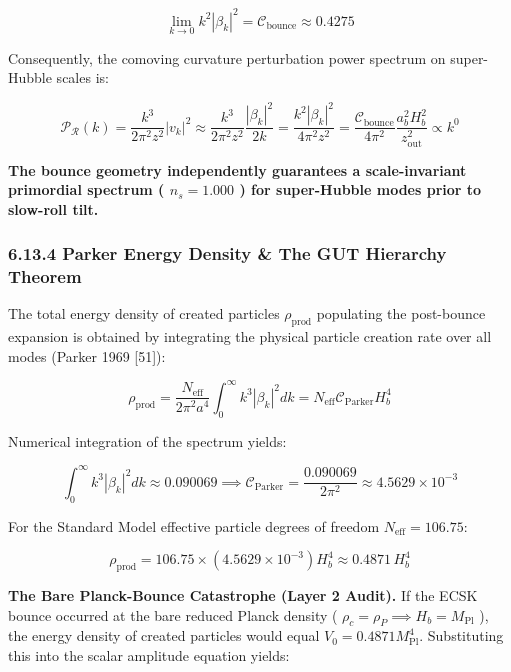 \documentclass[11pt,a4paper]{article}
\theoremstyle{definition}
\theoremstyle{remark}
\begin{document}
\begin{equation}
\lim_{k \to 0} k^2 |\beta_k|^2 = \mathcal{C}_{\text{bounce}} \approx 0.4275
\end{equation}


Consequently, the comoving curvature perturbation power spectrum on super-Hubble scales is:


\begin{equation}
\mathcal{P}_\mathcal{R}(k) = \frac{k^3}{2\pi^2 z^2} |v_k|^2 \approx \frac{k^3}{2\pi^2 z^2} \frac{|\beta_k|^2}{2k} = \frac{k^2 |\beta_k|^2}{4\pi^2 z^2} = \frac{\mathcal{C}_{\text{bounce}}}{4\pi^2} \frac{a_b^2 H_b^2}{z_{\text{out}}^2} \propto k^0
\end{equation}


\textbf{The bounce geometry independently guarantees a scale-invariant primordial spectrum ( $n_s = 1.000$ ) for super-Hubble modes prior to slow-roll tilt.}

\subsubsection{6.13.4 Parker Energy Density \& The GUT Hierarchy Theorem}

The total energy density of created particles $\rho_{\text{prod}}$ populating the post-bounce expansion is obtained by integrating the physical particle creation rate over all modes (Parker 1969 [51]):


\begin{equation}
\rho_{\text{prod}} = \frac{N_{\text{eff}}}{2\pi^2 a^4} \int_0^\infty k^3 |\beta_k|^2 dk = N_{\text{eff}} \mathcal{C}_{\text{Parker}} H_b^4
\end{equation}


Numerical integration of the spectrum yields:


\begin{equation}
\int_0^\infty k^3 |\beta_k|^2 dk \approx 0.090069 \implies \mathcal{C}_{\text{Parker}} = \frac{0.090069}{2\pi^2} \approx 4.5629 \times 10^{-3}
\end{equation}


For the Standard Model effective particle degrees of freedom $N_{\text{eff}} = 106.75$:


\begin{equation}
\rho_{\text{prod}} = 106.75 \times (4.5629 \times 10^{-3}) H_b^4 \approx 0.4871 \, H_b^4
\end{equation}


\textbf{The Bare Planck-Bounce Catastrophe (Layer 2 Audit).} If the ECSK bounce occurred at the bare reduced Planck density ( $\rho_c = \rho_P \implies H_b = M_{\text{Pl}}$ ), the energy density of created particles would equal $V_0 = 0.4871 M_{\text{Pl}}^4$. Substituting this into the scalar amplitude equation yields:
\end{document}
